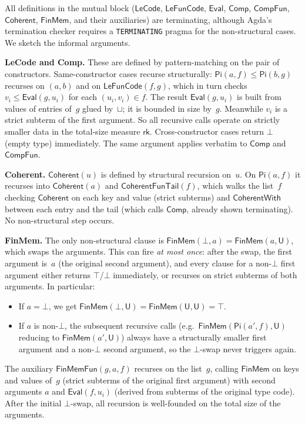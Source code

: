 \documentclass[11pt]{article}
\newcommand{\U}{\mathsf{U}}
\newcommand{\PiC}[2]{\mathsf{Pi}(#1,#2)}
\newcommand{\EvalFun}{\mathsf{Eval}}
\newcommand{\Bot}{\bot}
\begin{document}
All definitions in the mutual block ($\mathsf{LeCode}$, $\mathsf{LeFunCode}$,
$\EvalFun$, $\mathsf{Comp}$, $\mathsf{CompFun}$, $\mathsf{Coherent}$,
$\mathsf{FinMem}$, and their auxiliaries) are terminating, although Agda's
termination checker requires a \texttt{TERMINATING} pragma for the
non-structural cases.  We sketch the informal arguments.

\medskip\noindent\textbf{LeCode and Comp.}
These are defined by pattern-matching on the pair of constructors.
Same-constructor cases recurse structurally: $\PiC{a}{f} \leq \PiC{b}{g}$
recurses on $(a,b)$ and on $\mathsf{LeFunCode}(f,g)$, which in turn
checks $v_i \leq \EvalFun(g, u_i)$ for each $(u_i,v_i) \in f$.
The result $\EvalFun(g, u_i)$ is built from values of entries of~$g$
glued by~$\sqcup$; it is bounded in size by~$g$.  Meanwhile $v_i$ is a
strict subterm of the first argument.  So all recursive calls operate on
strictly smaller data in the total-size measure $\mathsf{rk}$.
Cross-constructor cases return $\bot$ (empty type) immediately.
The same argument applies verbatim to $\mathsf{Comp}$ and $\mathsf{CompFun}$.

\medskip\noindent\textbf{Coherent.}
$\mathsf{Coherent}(u)$ is defined by structural recursion on~$u$.
On $\PiC{a}{f}$ it recurses into $\mathsf{Coherent}(a)$ and
$\mathsf{CoherentFunTail}(f)$, which walks the list~$f$ checking
$\mathsf{Coherent}$ on each key and value (strict subterms) and
$\mathsf{CoherentWith}$ between each entry and the tail (which calls
$\mathsf{Comp}$, already shown terminating).  No non-structural step occurs.

\medskip\noindent\textbf{FinMem.}
The only non-structural clause is $\mathsf{FinMem}(\Bot, a) = \mathsf{FinMem}(a, \U)$,
which swaps the arguments.  This can fire \emph{at most once}: after the swap,
the first argument is~$a$ (the original second argument), and every clause for a
non-$\Bot$ first argument either returns $\top$/$\bot$ immediately, or recurses
on strict subterms of both arguments.  In particular:
\begin{itemize}
\item If $a = \Bot$, we get $\mathsf{FinMem}(\Bot, \U) = \mathsf{FinMem}(\U, \U) = \top$.
\item If $a$ is non-$\Bot$, the subsequent recursive calls
  (e.g.\ $\mathsf{FinMem}(\PiC{a'}{f}, \U)$ reducing to $\mathsf{FinMem}(a', \U)$)
  always have a structurally smaller first argument and a non-$\Bot$ second argument,
  so the $\Bot$-swap never triggers again.
\end{itemize}
The auxiliary $\mathsf{FinMemFun}(g, a, f)$ recurses on the list~$g$,
calling $\mathsf{FinMem}$ on keys and values of~$g$ (strict subterms of the
original first argument) with second arguments $a$ and $\EvalFun(f, u_i)$
(derived from subterms of the original type code).
After the initial $\Bot$-swap, all recursion is well-founded on the
total size of the arguments.
\end{document}
